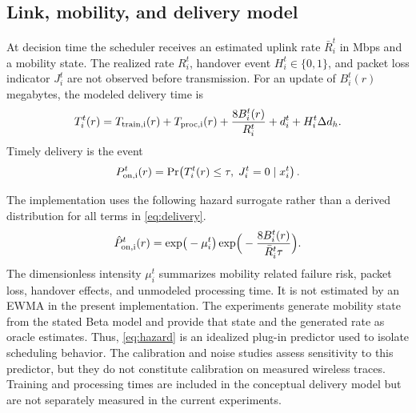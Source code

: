 \documentclass[preprint,12pt]{elsarticle}
\begin{document}
\subsection{Link, mobility, and delivery model}
At decision time the scheduler receives an estimated uplink rate $\bar R_i^t$ in Mbps and a mobility state. The realized rate $R_i^t$, handover event $H_i^t\in\{0,1\}$, and packet loss indicator $J_i^t$ are not observed before transmission. For an update of $B_i^t(r)$ megabytes, the modeled delivery time is
\begin{equation}
T_i^t(r)=T_{\rm train,i}(r)+T_{\rm proc,i}(r)+\frac{8B_i^t(r)}{R_i^t}+d_i^t+H_i^t\Delta d_h.
\label{eq:delivery}
\end{equation}
Timely delivery is the event
\begin{equation}
P_{\rm on,i}^t(r)=\Pr\!\left(T_i^t(r)\le\tau,\;J_i^t=0\mid x_i^t\right).
\label{eq:pon}
\end{equation}

The implementation uses the following hazard surrogate rather than a derived distribution for all terms in \eqref{eq:delivery}.
\begin{equation}
\hat P_{\rm on,i}^t(r)=\exp\!\big(-\mu_i^t\big)\exp\!\Big(-\frac{8B_i^t(r)}{\bar R_i^t\tau}\Big).
\label{eq:hazard}
\end{equation}
The dimensionless intensity $\mu_i^t$ summarizes mobility related failure risk, packet loss, handover effects, and unmodeled processing time. It is not estimated by an EWMA in the present implementation. The experiments generate mobility state from the stated Beta model and provide that state and the generated rate as oracle estimates. Thus, \eqref{eq:hazard} is an idealized plug-in predictor used to isolate scheduling behavior. The calibration and noise studies assess sensitivity to this predictor, but they do not constitute calibration on measured wireless traces. Training and processing times are included in the conceptual delivery model but are not separately measured in the current experiments.
\end{document}
